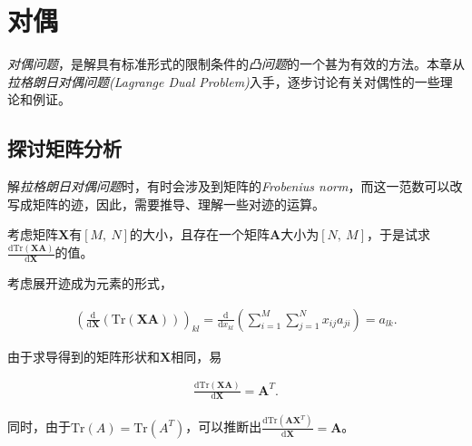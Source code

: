 \chapter{对偶}
\emph{对偶问题}，是解具有标准形式的限制条件的\emph{凸问题}的一个甚为有效的方法。本章从\emph{拉格朗日对偶问题(Lagrange Dual Problem)}入手，逐步讨论有关对偶性的一些理论和例证。

\section{探讨矩阵分析}
解\emph{拉格朗日对偶问题}时，有时会涉及到矩阵的\emph{\textit{Frobenius} norm}，而这一范数可以改写成矩阵的迹，因此，需要推导、理解一些对迹的运算。

\begin{example}
	考虑矩阵$\mathbf{X}$有$[M,~N]$的大小，且存在一个矩阵$\mathbf{A}$大小为$[N,~M]$，于是试求$\frac{\mathrm{d} \mathrm{Tr}(\mathbf{X} \mathbf{A}) }{\mathrm{d}\mathbf{X}}$的值。
	
	考虑展开迹成为元素的形式，
	
	\begin{equation}\label{fml:c5:MulTrDe1}
		\begin{aligned}
			\left(\frac{\mathrm{d}}{\mathrm{d}\mathbf{X}} \left( \mathrm{Tr}(\mathbf{X} \mathbf{A}) \right) \right)_{kl} = \frac{\mathrm{d}}{\mathrm{d}x_{kl}} \left( \sum\limits_{i=1}^{M}{ \sum\limits_{j=1}^{N}{ x_{ij} a_{ji} } } \right) = a_{lk}.
		\end{aligned}
	\end{equation}
	
	由于求导得到的矩阵形状和$\mathbf{X}$相同，易
	
	\begin{equation}\label{fml:c5:MulTrDe1-1}
		\begin{aligned}
			\frac{\mathrm{d} \mathrm{Tr}(\mathbf{X} \mathbf{A}) }{\mathrm{d}\mathbf{X}} = \mathbf{A}^T.
		\end{aligned}
	\end{equation}
	
	同时，由于$\mathrm{Tr}(A)=\mathrm{Tr}(A^T)$，可以推断出$\frac{\mathrm{d} \mathrm{Tr}(\mathbf{A} \mathbf{X}^T) }{\mathrm{d}\mathbf{X}} = \mathbf{A}$。
\end{example}

